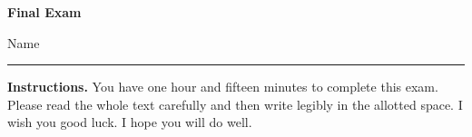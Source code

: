 \documentclass[letterpaper,12pt]{exam}
\begin{document}

\thispagestyle{empty}%
\Head

\vspace{15pt}

\centerline{\Large \bf Final Exam}%
\vspace{12pt}%


\vspace{.3cm}

\setlength{\baselineskip}{15pt}




\noindent Name \vspace{0.4cm} \noindent\rule{5.5in}{0.1mm} %

\noindent \textbf{Instructions.} You have one hour and fifteen
minutes to complete this exam. Please read the whole text carefully
and then write legibly in the allotted space. I wish you good luck.
I hope you will do well.\vspace{.2in}
\end{document}
